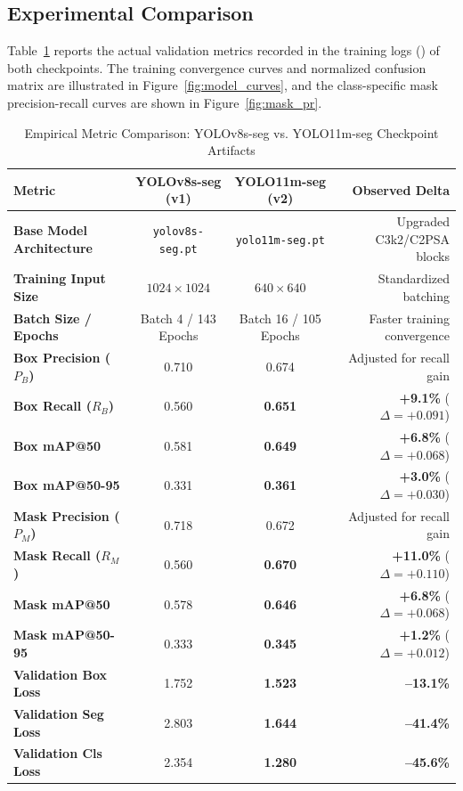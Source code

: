 \documentclass[12pt,a4paper]{article}
\begin{document}
\subsection{Experimental Comparison}
Table~\ref{tab:model_comparison} reports the actual validation metrics recorded in the training logs () of both checkpoints. The training convergence curves and normalized confusion matrix are illustrated in Figure~\ref{fig:model_curves}, and the class-specific mask precision-recall curves are shown in Figure~\ref{fig:mask_pr}.

\begin{table}[htbp]
\centering
\small
\caption{Empirical Metric Comparison: YOLOv8s-seg vs. YOLO11m-seg Checkpoint Artifacts}
\label{tab:model_comparison}
\begin{tabularx}{\textwidth}{l c c r}
\toprule
\textbf{Metric} & \textbf{YOLOv8s-seg (v1)} & \textbf{YOLO11m-seg (v2)} & \textbf{Observed Delta} \\
\midrule
\textbf{Base Model Architecture} & \texttt{yolov8s-seg.pt} & \texttt{yolo11m-seg.pt} & Upgraded C3k2/C2PSA blocks \\
\textbf{Training Input Size} & $1024 \times 1024$ & $640 \times 640$ & Standardized batching \\
\textbf{Batch Size / Epochs} & Batch 4 / 143 Epochs & Batch 16 / 105 Epochs & Faster training convergence \\
\midrule
\textbf{Box Precision ($P_B$)} & 0.710 & 0.674 & Adjusted for recall gain \\
\textbf{Box Recall ($R_B$)} & 0.560 & \textbf{0.651} & \textbf{+9.1\%} ($\Delta = +0.091$) \\
\textbf{Box mAP@50} & 0.581 & \textbf{0.649} & \textbf{+6.8\%} ($\Delta = +0.068$) \\
\textbf{Box mAP@50-95} & 0.331 & \textbf{0.361} & \textbf{+3.0\%} ($\Delta = +0.030$) \\
\midrule
\textbf{Mask Precision ($P_M$)} & 0.718 & 0.672 & Adjusted for recall gain \\
\textbf{Mask Recall ($R_M$)} & 0.560 & \textbf{0.670} & \textbf{+11.0\%} ($\Delta = +0.110$) \\
\textbf{Mask mAP@50} & 0.578 & \textbf{0.646} & \textbf{+6.8\%} ($\Delta = +0.068$) \\
\textbf{Mask mAP@50-95} & 0.333 & \textbf{0.345} & \textbf{+1.2\%} ($\Delta = +0.012$) \\
\midrule
\textbf{Validation Box Loss} & 1.752 & \textbf{1.523} & \textbf{--13.1\%} \\
\textbf{Validation Seg Loss} & 2.803 & \textbf{1.644} & \textbf{--41.4\%} \\
\textbf{Validation Cls Loss} & 2.354 & \textbf{1.280} & \textbf{--45.6\%} \\
\bottomrule
\end{tabularx}
\end{table}
\end{document}
